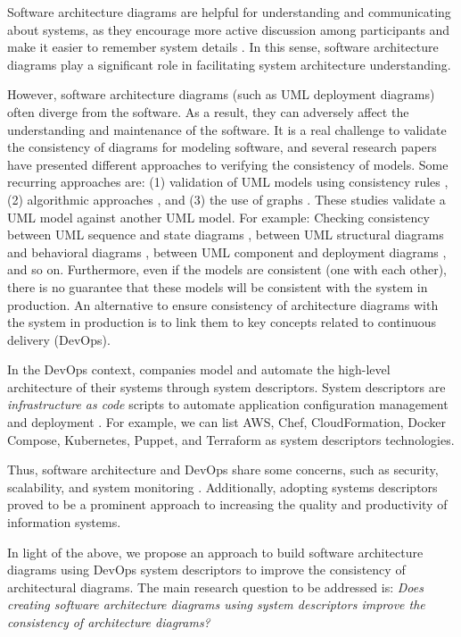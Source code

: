 \documentclass[sigconf]{acmart}
\begin{document}
Software architecture diagrams are helpful for understanding and communicating about systems, as they encourage more active discussion among participants and make it easier to remember system details \citep{jolak2020}. In this sense, software architecture diagrams play a significant role in facilitating system architecture understanding.

However, software architecture diagrams (such as UML deployment diagrams) often diverge from the software. As a result, they can adversely affect the understanding and maintenance of the software. 
It is a real challenge to validate the consistency of diagrams for modeling software, and several research papers have presented different approaches to verifying the consistency of models. Some recurring approaches are: (1) validation of UML models using consistency rules \cite{Ha2003, Amor2011}, (2) algorithmic approaches \cite{litvak2003}, and (3) the use of graphs \cite{Mohammadi2014}.
These studies validate a UML model against another UML model. For example: Checking consistency between UML sequence and state diagrams \cite{litvak2003}, between UML structural diagrams and behavioral diagrams \cite{Ha2003}, between UML component and deployment diagrams \cite{Mohammadi2014}, and so on. Furthermore, even if the models are consistent (one with each other), there is no guarantee that these models will be consistent with the system in production. An alternative to ensure consistency of architecture diagrams with the system in production is to link them to key concepts related to continuous delivery (DevOps).

In the DevOps context, companies model and automate the high-level architecture of their systems through system descriptors. System descriptors are \textit{infrastructure as code} scripts \cite{morris2016} to automate application configuration management and deployment \cite{wurster2019}. For example, we can list AWS, Chef, CloudFormation, Docker Compose, Kubernetes, Puppet, and Terraform as system descriptors technologies. 

Thus, software architecture and DevOps share some concerns, such as security, scalability, and system monitoring \cite{bass2015}. Additionally, adopting systems descriptors proved to be a prominent approach to increasing the quality and productivity of information systems.

In light of the above, we propose an approach to build software architecture diagrams using DevOps system descriptors to improve the consistency of architectural diagrams. The main research question to be addressed is: \textit{Does creating software architecture diagrams using system descriptors improve the consistency of architecture diagrams?}
\end{document}
